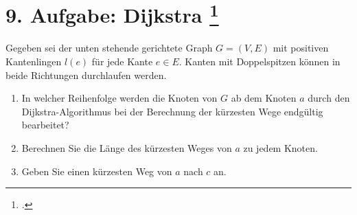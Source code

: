 \documentclass{lehramt-informatik-aufgabe}
\begin{document}
\liAufgabenTitel{}
\section{9. Aufgabe: Dijkstra
\footcite{66115:2013:09}}

Gegeben sei der unten stehende gerichtete Graph $G=(V, E)$ mit positiven
Kantenlingen $l(e)$ für jede Kante $e \in E$. Kanten mit Doppelspitzen
können in beide Richtungen durchlaufen werden.

\begin{enumerate}

%

\item In welcher Reihenfolge werden die Knoten von $G$ ab dem Knoten $a$
durch den Dijkstra-Algorithmus bei der Berechnung der kürzesten Wege
endgültig bearbeitet?

%

\item Berechnen Sie die Länge des kürzesten Weges von $a$ zu jedem
Knoten.

%

\item Geben Sie einen kürzesten Weg von $a$ nach $c$ an.
\end{enumerate}
\end{document}

